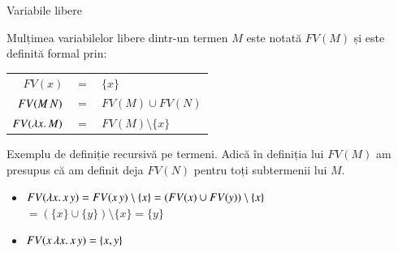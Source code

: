 \documentclass[xcolor=pdftex,romanian,colorlinks]{beamer}
\begin{document}
\begin{frame}[fragile]{ Variabile libere}


Mulțimea \alert{variabilelor libere} dintr-un termen $M$ este notată $FV(M)$ și este definită formal prin:
\begin{center}
\begin{tabular}{rcl}
$FV(x)$ & $=$ & $\{x\}$ \\
$FV(M\, N)$ & $=$ & $FV(M) \cup FV(N)$ \\
$FV(\lambda x.\,M)$ & $=$ & $FV(M) \setminus \{x\}$ \\
\end{tabular}
\end{center}

Exemplu de definiție recursivă pe termeni. Adică în definiția lui $FV(M)$ am presupus că am definit deja $FV(N)$ pentru toți subtermenii lui $M$.

\begin{example}
\begin{itemize}
\item $FV(\lambda x.\,x\, y) = FV(x\, y) \setminus \{x\} = (FV(x)\cup FV(y))\setminus \{x\} $ \\
	\hspace{1.8cm} $ = (\{x\}\cup \{y\}) \setminus \{x\} = \{y\}$
\item $FV(x\, \lambda x.\,x\, y) = \{x, y\}$
\end{itemize}
\end{example}
\end{frame}

\end{document}
